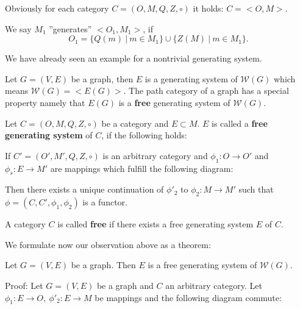 Obviously for each category $C = (O, M, Q, Z, \circ)$ it holds: $C = {<}O,
M{}>$.

We say $M_1$ ''generates'' ${<}O_1, M_1{>}$, if \[ O_1 = \{ Q(m)\ |\ m \in M_1
\} \cup \{ Z(M)\ |\ m \in M_1 \}. \]

We have already seen an example for a nontrivial generating system.

Let $G = (V,E)$ be a graph, then $E$ is a generating system of $\mathcal{W}(G)$
which means $\mathcal{W}(G) = {<}E(G){>}$. The path category of a graph has a
special property namely that $E(G)$ is a {\bf free} generating system of
$\mathcal{W}(G)$.

\begin{definition}
Let $C = (O, M, Q, Z, \circ)$ be a category and $E \subset M$. $E$ is called a
{\bf free generating system} of $C$, if the following holds:

If $C' = (O', M', Q, Z, \circ)$ is an arbitrary category and $\phi_1 : O \to O'$
and $\phi_s : E \to M'$ are mappings which fulfill the following diagram:

\begin{center}
\end{center}

Then there exists a unique continuation of $\phi'_2$ to $\phi_2 : M \to M'$ such
that $\phi = (C, C', \phi_1, \phi_2)$ is a functor.
\end{definition}

\begin{definition}
A category $C$ is called {\bf free} if there exists a free generating system $E$
of $C$.
\end{definition}

We formulate now our observation above as a theorem:

\begin{theorem}
Let $G = (V, E)$ be a graph. Then $E$ is a free generating system of
$\mathcal{W}(G)$.
\end{theorem} 

Proof: Let $G = (V, E)$ be a graph and $C$ an arbitrary category. Let $\phi_1 :
E \to O,\ \phi'_2 : E \to M$ be mappings and the following diagram commute:

